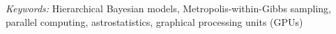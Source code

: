 \documentclass[12pt]{article}
\numberwithin{equation}{section}
\numberwithin{figure}{section}
\numberwithin{table}{section}
\newcommand\enote[1]{{$\bullet\bullet\bullet$}{\sl [#1]}{$\bullet\bullet\bullet$}}
\begin{document}
\noindent%
{\it Keywords:}
Hierarchical Bayesian models, Metropolis-within-Gibbs sampling, parallel computing, astrostatistics, graphical processing units (GPUs)
\vfill

\newpage {} %





%











\end{document}
